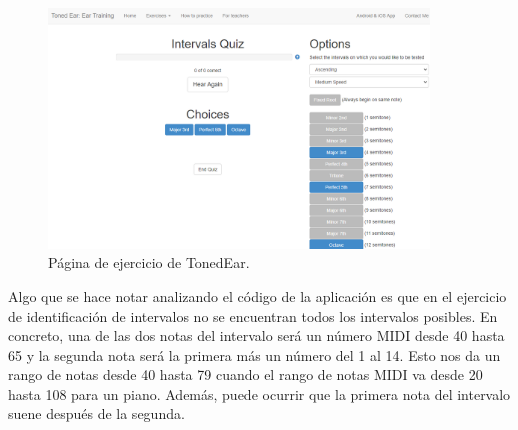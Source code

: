 \documentclass[12pt,twoside,titlepage]{report}
\begin{document}
\begin{figure}[H] 
    \includegraphics[width=0.9\textwidth]{Estado del Arte/tonedear}
    \centering
    \caption{Página de ejercicio de TonedEar.}
    \label{fig:tonedear}
\end{figure}

Algo que se hace notar analizando el código de la aplicación es que en el ejercicio de identificación de intervalos no se encuentran todos los intervalos posibles. En concreto, una de las dos notas del intervalo será un número MIDI desde 40 hasta 65 y la segunda nota será la primera más un número del 1 al 14. Esto nos da un rango de notas desde 40 hasta 79 cuando el rango de notas MIDI va desde 20 hasta 108 para un piano. Además, puede ocurrir que la primera nota del intervalo suene después de la segunda.

\end{document}
